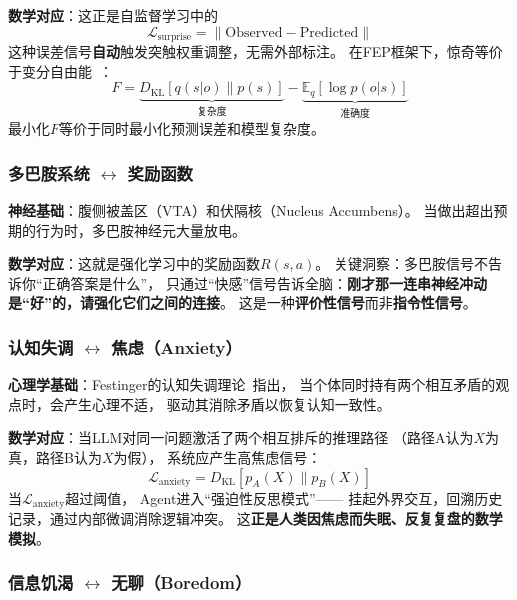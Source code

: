 \documentclass[11pt,a4paper]{article}
\begin{document}
\textbf{数学对应}：这正是自监督学习中的
\begin{equation}
\mathcal{L}_{\text{surprise}} = \| \text{Observed} - \text{Predicted} \|
\end{equation}
这种误差信号\textbf{自动}触发突触权重调整，无需外部标注。
在FEP框架下，惊奇等价于变分自由能~\cite{friston2022active}：
\begin{equation}
F = \underbrace{D_{\text{KL}}[q(s|o) \| p(s)]}_{\text{复杂度}} - \underbrace{\mathbb{E}_q[\log p(o|s)]}_{\text{准确度}}
\end{equation}
最小化$F$等价于同时最小化预测误差和模型复杂度。

\subsubsection{多巴胺系统 $\leftrightarrow$ 奖励函数}

\textbf{神经基础}：腹侧被盖区（VTA）和伏隔核（Nucleus Accumbens）。
当做出超出预期的行为时，多巴胺神经元大量放电。

\textbf{数学对应}：这就是强化学习中的奖励函数$R(s,a)$。
关键洞察：多巴胺信号不告诉你``正确答案是什么''，
只通过``快感''信号告诉全脑：\textbf{刚才那一连串神经冲动是``好''的，请强化它们之间的连接}。
这是一种\textbf{评价性信号}而非\textbf{指令性信号}。

\subsubsection{认知失调 $\leftrightarrow$ 焦虑（Anxiety）}

\textbf{心理学基础}：Festinger的认知失调理论~\cite{festinger1957cognitive}指出，
当个体同时持有两个相互矛盾的观点时，会产生心理不适，
驱动其消除矛盾以恢复认知一致性。

\textbf{数学对应}：当LLM对同一问题激活了两个相互排斥的推理路径
（路径A认为$X$为真，路径B认为$X$为假），
系统应产生高焦虑信号：
\begin{equation}
\mathcal{L}_{\text{anxiety}} = D_{\text{KL}}[p_A(X) \| p_B(X)]
\end{equation}
当$\mathcal{L}_{\text{anxiety}}$超过阈值，
Agent进入``强迫性反思模式''——
挂起外界交互，回溯历史记录，通过内部微调消除逻辑冲突。
这\textbf{正是人类因焦虑而失眠、反复复盘的数学模拟}。

\subsubsection{信息饥渴 $\leftrightarrow$ 无聊（Boredom）}
\end{document}
